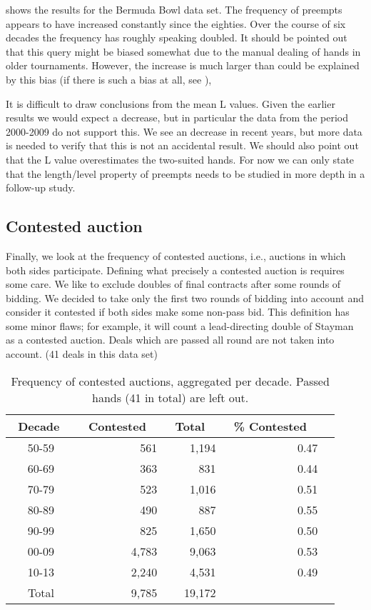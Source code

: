 \documentclass{llncs}
\begin{document}
 shows the results for the Bermuda Bowl data
set. The frequency of preempts appears to have increased constantly
since the eighties. Over the course of six decades the frequency has
roughly speaking doubled. It should be pointed out that this query
might be biased somewhat due to the manual dealing of hands in older
tournaments. However, the increase is much larger than could be
explained by this bias (if there is such a bias at all, see
), 

It is difficult to draw conclusions from the mean L values. Given the
earlier results we would expect a decrease, but in particular the
data from the period 2000-2009 do not support this. 
We see an decrease in recent years, but more data is
needed to verify that this is not an accidental result. 
We should also point out that the L value overestimates the two-suited
hands.  For now we can only state that the length/level 
property of preempts needs to be studied in more depth in a follow-up
study.   

\subsection{Contested auction}

Finally, we look at the frequency of contested auctions, i.e., auctions
in which both sides participate. Defining what precisely a contested
auction is requires some care. We like to exclude doubles of final
contracts after some rounds of bidding. We decided to take only the
first two rounds of bidding into account and consider it contested if
both sides make some non-pass bid. This definition has some minor
flaws; for example, it will count a lead-directing double of Stayman as a
contested auction.  Deals which are passed all round are not taken into
account. (41 deals in this data set) 

\begin{table}
\caption{Frequency of contested auctions, aggregated per
decade. Passed hands (41 in total) are left out.}  
\label{tbl:contested-auction}
\centering\footnotesize
\begin{tabular}{|c|r|r|r|r|}
\hline
\bf \ Decade \ & \bf \ Contested \ & \bf \ Total \  & 
\bf \ \% Contested \ \\ \hline
50-59 & 561 & 1,194 & 0.47 \\
60-69 & 363 & 831 & 0.44\\
70-79 & 523 & 1,016 & 0.51\\
80-89 & 490 & 887 & 0.55\\
90-99 & 825 & 1,650 & 0.50\\
00-09 & 4,783 & 9,063 & 0.53\\
10-13 & 2,240 & 4,531 & 0.49\\
\hline
Total  & 9,785 & 19,172 & \\ 
\hline
\end{tabular}
\end{table}
\end{document}
